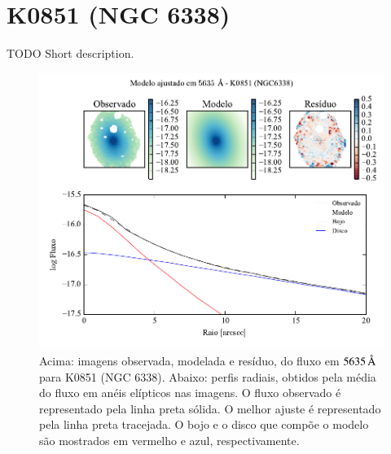 
\section{K0851 (NGC 6338)}
\label{apendice:Decomp:K0851}

TODO Short description.

\begin{figure}
	\includegraphics[page=1]{figuras-decomp/K0851_sample006a}
	\caption[Ajuste morfológico em $5635\,\angstrom$ de K0851 (NGC 6338)]
	{Acima: imagens observada, modelada e resíduo, do fluxo em $5635\,\angstrom$
	para K0851 (NGC 6338). Abaixo: perfis radiais, obtidos pela média do fluxo em
	anéis elípticos nas imagens. O fluxo observado é representado pela linha preta
	sólida. O melhor ajuste é representado pela linha preta tracejada. O bojo e o
	disco que compõe o modelo são mostrados em vermelho e azul, respectivamente.}
	\label{fig:decompRadprof:K0851}
\end{figure}


